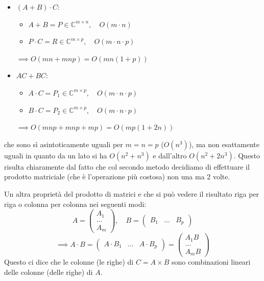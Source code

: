 \documentclass[a4paper,11pt]{article}
\begin{document}
\begin{itemize}
	\item $(A + B) \cdot C$:
		\begin{itemize}
			\item $A + B = P \in \mathbb{C}^{m \times n}, \quad O(m\cdot n)$
			\item $P \cdot C = R \in \mathbb{C}^{m \times p}, \quad O(m \cdot n \cdot p)$
		\end{itemize}
		$
		\implies O(mn + mnp) = O\left( mn(1 + p) \right)
		$
	\item $AC + BC$:
		\begin{itemize}
			\item $A \cdot C = P_1 \in \mathbb{C}^{m \times p}, \quad O(m \cdot n \cdot p)$
			\item $B \cdot C = P_2 \in \mathbb{C}^{m \times p}, \quad O(m \cdot n \cdot p)$
		\end{itemize}
		$
		\implies O(mnp + mnp + mp) = O\left( mp(1 + 2n) \right)
		$
\end{itemize}
che sono sì asintoticamente uguali per $m = n = p$ ($O(n^3)$),  ma non esattamente uguali in quanto da un lato si ha $O(n^2 + n^3)$ e dall'altro $O(n^2 + 2 n^3)$.
Questo risulta chiaramente dal fatto che col secondo metodo decidiamo di effettuare il prodotto matriciale (che è l'operazione più costosa) non una ma 2 volte.

\par\medskip

Un altra proprietà del prodotto di matrici e che si può vedere il risultato riga per riga o colonna per colonna nei seguenti modi:
$$
A = \begin{pmatrix}
A_1 \\
... \\ 
A_m
\end{pmatrix}, \quad
B = \begin{pmatrix}
	B_1 & ... & B_p
\end{pmatrix}
$$
$$
\implies
A \cdot B = \begin{pmatrix}
	A \cdot B_1 & ... & A \cdot B_p
\end{pmatrix} = \begin{pmatrix}
A_1 B \\ ... \\ A_m B
\end{pmatrix}
$$
Questo ci dice che le colonne (le righe) di $C = A \times B$ sono combinazioni lineari delle colonne (delle righe) di $A$.
\end{document}
